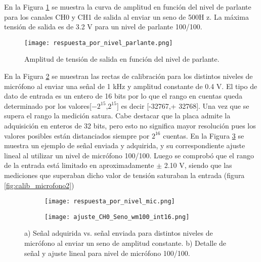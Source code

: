 \documentclass[a4paper, 11pt]{article}
\begin{document}
En la Figura \ref{fig:calib_parlante} se muestra la curva de amplitud en función del nivel de parlante para los canales CH0 y CH1 de salida al enviar un seno de 500H z. La máxima tensión de salida es de 3.2 V para un nivel de parlante 100/100.

\begin{figure} [H]
\centering
\texttt{[image: respuesta\_por\_nivel\_parlante.png]}
\caption{Amplitud de tensión de salida en función del nivel de parlante.\label{fig:calib_parlante}}
\end{figure} 

 En la Figura \ref{fig:calibmic} se muestran las rectas de calibración para los distintos niveles de micrófono al enviar una señal de 1 kHz y amplitud constante de 0.4 V. El tipo de dato de entrada es un entero de 16 bits por lo que el rango en cuentas queda determinado por los valores[$-2^{15}$,$2^{15}$] es decir [-32767,+ 32768]. Una vez que se supera el rango la medición satura. Cabe destacar que la placa admite la adquisición en enteros de 32 bits, pero esto no significa mayor resolución pues los valores posibles están distanciados siempre por $2^{16}$  cuentas.
En la Figura \ref{fig:ejemplo_rangomic} se muestra un ejemplo de señal enviada y adquirida, y su correspondiente ajuste lineal al utilizar un nivel de micrófono 100/100. 
Luego se comprobó que el rango de la entrada está limitado en aproximadamente $\pm$ 2.10 V, siendo que las mediciones que superaban dicho valor de tensión saturaban la entrada (figura \ref{fig:calib_microfono2})

\begin{figure}[H]
        \begin{subfigure}[b]{0.5\textwidth}
                \centering
                \texttt{[image: respuesta\_por\_nivel\_mic.png]}
                \caption{} \label{fig:calibmic}
        \end{subfigure}%
        \begin{subfigure}[b]{0.5\textwidth}
                \centering
                \texttt{[image: ajuste\_CH0\_Seno\_wm100\_int16.png]}
                \caption{} \label{fig:ejemplo_rangomic}
        \end{subfigure}%
        \caption{a) Señal adquirida vs. señal enviada para distintos niveles de micrófono al enviar un seno de amplitud constante. b) Detalle de señal y ajuste lineal para nivel de micrófono 100/100.}\label{fig:calib_microfono}
\end{figure}
\end{document}
